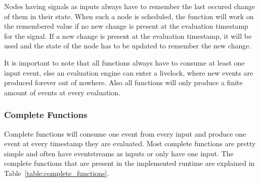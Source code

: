 Nodes having signals as inputs always have to remember the last occured change of them in their state.
When such a node is scheduled, the function will work on the remembered value if no new change is present at the evaluation timestamp for the signal.
If a new change is present at the evaluation timestamp, it will be used and the state of the node has to be updated to remember the new change.

It is important to note that all functions always have to consume at least one input event, else an evaluation engine can enter a livelock, where new events are produced forever out of nowhere.
Also all functions will only produce a finite amount of events at every evaluation.

\subsubsection{Complete Functions}
\label{sec:concepts:def:tessla_functions:complete}

Complete functions will consume one event from every input and produce one event at every timestamp they are evaluated.
Most complete functions are pretty simple and often have eventstreams as inputs or only have one input.
The complete functions that are present in the implemented runtime are explained in Table~\ref{table:complete_functions}.


